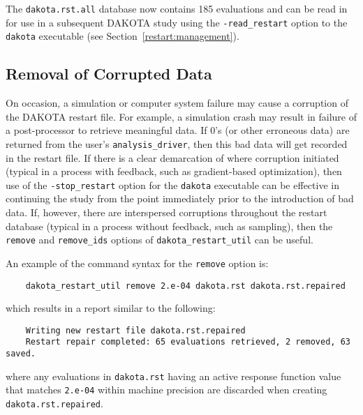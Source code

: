 The \texttt{dakota.rst.all} database now contains 185 evaluations and
can be read in for use in a subsequent DAKOTA study using the
\texttt{-read\_restart} option to the \texttt{dakota} executable (see
Section~\ref{restart:management}).

\subsection{Removal of Corrupted Data}\label{restart:utility:removal}

On occasion, a simulation or computer system failure may cause a
corruption of the DAKOTA restart file. For example, a simulation crash
may result in failure of a post-processor to retrieve meaningful data.
If 0's (or other erroneous data) are returned from the user's
\texttt{analysis\_driver}, then this bad data will get recorded in the
restart file. If there is a clear demarcation of where corruption
initiated (typical in a process with feedback, such as gradient-based
optimization), then use of the \texttt{-stop\_restart} option for the
\texttt{dakota} executable can be effective in continuing the study
from the point immediately prior to the introduction of bad data. If,
however, there are interspersed corruptions throughout the restart
database (typical in a process without feedback, such as sampling),
then the \texttt{remove} and \texttt{remove\_ids} options of
\texttt{dakota\_restart\_util} can be useful.

An example of the command syntax for the \texttt{remove} option is:
\begin{small}
\begin{verbatim}
    dakota_restart_util remove 2.e-04 dakota.rst dakota.rst.repaired
\end{verbatim}
\end{small}
which results in a report similar to the following:
\begin{small}
\begin{verbatim}
    Writing new restart file dakota.rst.repaired
    Restart repair completed: 65 evaluations retrieved, 2 removed, 63 saved.
\end{verbatim}
\end{small}
where any evaluations in \texttt{dakota.rst} having an active response
function value that matches \texttt{2.e-04} within machine precision
are discarded when creating \texttt{dakota.rst.repaired}.

